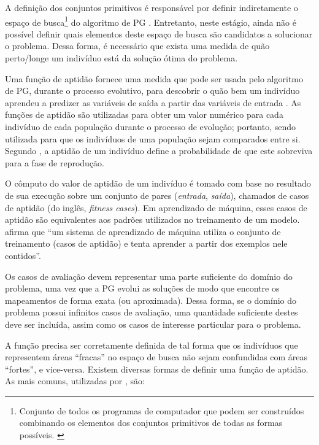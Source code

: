 A definição dos conjuntos primitivos é responsável por definir indiretamente o espaço de busca\footnote{Conjunto de todos os programas de computador que podem ser construídos combinando os elementos dos conjuntos primitivos de todas as formas possíveis. \cite{poli2008}} do algoritmo de PG \cite{poli2008}. Entretanto, neste estágio, ainda não é possível definir quais elementos deste espaço de busca são candidatos a solucionar o problema. Dessa forma, é necessário que exista uma medida de quão perto/longe um indivíduo está da solução ótima do problema.

Uma função de aptidão fornece uma medida que pode ser usada pelo algoritmo de PG, durante o processo evolutivo, para descobrir o quão bem um indivíduo aprendeu a predizer as variáveis de saída a partir das variáveis de entrada \cite{banzhaf1998}. As funções de aptidão são utilizadas para obter um valor numérico para cada indivíduo de cada população durante o processo de evolução; portanto, sendo utilizada para que os indivíduos de uma população sejam comparados entre si. Segundo , a aptidão de um indivíduo define a probabilidade de que este sobreviva para a fase de reprodução.

O cômputo do valor de aptidão de um indivíduo é tomado com base no resultado de sua execução sobre um conjunto de pares (\textit{entrada}, \textit{saída}), chamados de casos de aptidão (do inglês, \textit{fitness cases}). Em aprendizado de máquina, esses casos de aptidão são equivalentes aos padrões utilizados no treinamento de um modelo.  afirma que ``um sistema de aprendizado de máquina utiliza o conjunto de treinamento (casos de aptidão) e tenta aprender a partir dos exemplos nele contidos''. %

Os casos de avaliação devem representar uma parte suficiente do domínio do problema, uma vez que a PG evolui as soluções de modo que encontre os mapeamentos de forma exata (ou aproximada). Dessa forma, se o domínio do problema possui infinitos casos de avaliação, uma quantidade suficiente destes deve ser incluída, assim como os casos de interesse particular para o problema.

A função precisa ser corretamente definida de tal forma que os indivíduos que representem áreas ``fracas'' no espaço de busca não sejam confundidas com áreas ``fortes'', e vice-versa. Existem diversas formas de definir uma função de aptidão. As mais comuns, utilizadas por , são:

